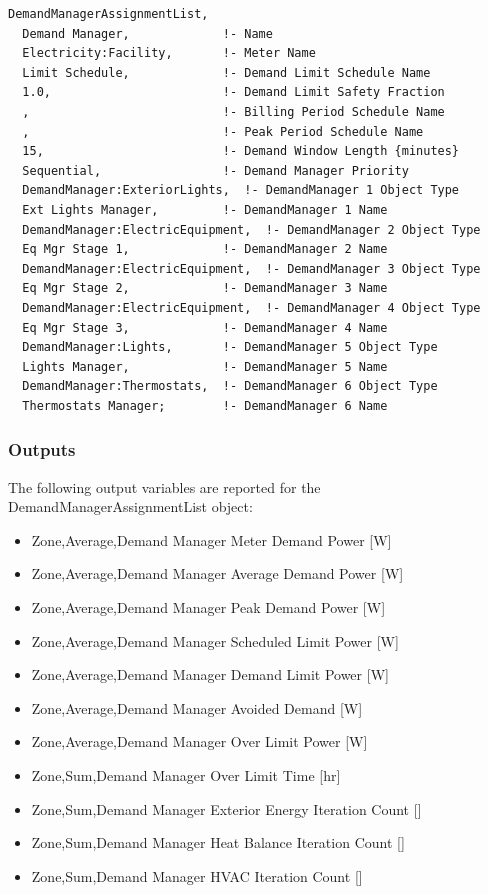 \begin{lstlisting}
DemandManagerAssignmentList,
  Demand Manager,             !- Name
  Electricity:Facility,       !- Meter Name
  Limit Schedule,             !- Demand Limit Schedule Name
  1.0,                        !- Demand Limit Safety Fraction
  ,                           !- Billing Period Schedule Name
  ,                           !- Peak Period Schedule Name
  15,                         !- Demand Window Length {minutes}
  Sequential,                 !- Demand Manager Priority
  DemandManager:ExteriorLights,  !- DemandManager 1 Object Type
  Ext Lights Manager,         !- DemandManager 1 Name
  DemandManager:ElectricEquipment,  !- DemandManager 2 Object Type
  Eq Mgr Stage 1,             !- DemandManager 2 Name
  DemandManager:ElectricEquipment,  !- DemandManager 3 Object Type
  Eq Mgr Stage 2,             !- DemandManager 3 Name
  DemandManager:ElectricEquipment,  !- DemandManager 4 Object Type
  Eq Mgr Stage 3,             !- DemandManager 4 Name
  DemandManager:Lights,       !- DemandManager 5 Object Type
  Lights Manager,             !- DemandManager 5 Name
  DemandManager:Thermostats,  !- DemandManager 6 Object Type
  Thermostats Manager;        !- DemandManager 6 Name
\end{lstlisting}

\subsubsection{Outputs}\label{outputs-007}

The following output variables are reported for the DemandManagerAssignmentList object:

\begin{itemize}
\item
  Zone,Average,Demand Manager Meter Demand Power {[}W{]}
\item
  Zone,Average,Demand Manager Average Demand Power {[}W{]}
\item
  Zone,Average,Demand Manager Peak Demand Power {[}W{]}
\item
  Zone,Average,Demand Manager Scheduled Limit Power {[}W{]}
\item
  Zone,Average,Demand Manager Demand Limit Power {[}W{]}
\item
  Zone,Average,Demand Manager Avoided Demand {[}W{]}
\item
  Zone,Average,Demand Manager Over Limit Power {[}W{]}
\item
  Zone,Sum,Demand Manager Over Limit Time {[}hr{]}
\item
  Zone,Sum,Demand Manager Exterior Energy Iteration Count {[]}
\item
  Zone,Sum,Demand Manager Heat Balance Iteration Count {[]}
\item
  Zone,Sum,Demand Manager HVAC Iteration Count {[]}
\end{itemize}

